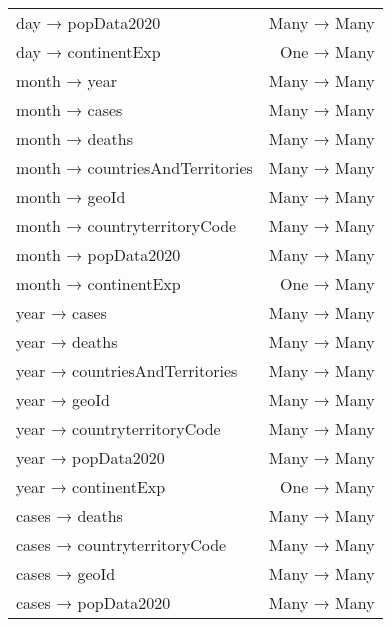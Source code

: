 \documentclass[]{article}
\begin{document}
\begin{longtable}[c]{@{}lr@{}}
day → popData2020                              & Many → Many                       \\
day → continentExp                             & One → Many                        \\
month → year                                   & Many → Many                       \\
month → cases                                  & Many → Many                       \\
month → deaths                                 & Many → Many                       \\
month → countriesAndTerritories                & Many → Many                       \\
month → geoId                                  & Many → Many                       \\
month → countryterritoryCode                   & Many → Many                       \\
month → popData2020                            & Many → Many                       \\
month → continentExp                           & One → Many                        \\
year → cases                                   & Many → Many                       \\
year → deaths                                  & Many → Many                       \\
year → countriesAndTerritories                 & Many → Many                       \\
year → geoId                                   & Many → Many                       \\
year → countryterritoryCode                    & Many → Many                       \\
year → popData2020                             & Many → Many                       \\
year → continentExp                            & One → Many                        \\
cases → deaths                                 & Many → Many                       \\
cases → countryterritoryCode                   & Many → Many                       \\
cases → geoId                                  & Many → Many                       \\
cases → popData2020                            & Many → Many                       \\

\end{longtable}
\end{document}
